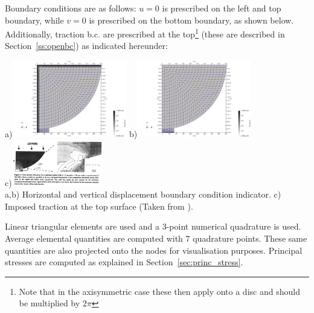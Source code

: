 Boundary conditions are as follows: $u=0$ is prescribed on the left and top boundary, 
while $v=0$ is prescribed on the bottom boundary, as shown below.
Additionally, traction b.c. are prescribed at the top\footnote{Note that 
in the axisymmetric case these then apply onto a disc and should be multiplied by $2\pi$} (these
are described in Section~\ref{ss:openbc}) as indicated hereunder:
\begin{center}
a)\includegraphics[width=5cm]{python_codes/fieldstone_63/images/bc_u}
b)\includegraphics[width=5cm]{python_codes/fieldstone_63/images/bc_v}\\
c)\includegraphics[width=4cm]{python_codes/fieldstone_63/images/wowu95}\\
{\captionfont a,b) Horizontal and vertical displacement boundary condition indicator.
c) Imposed traction at the top surface (Taken from \cite{wowu95}).}
\end{center}

Linear triangular elements are used and a 3-point numerical quadrature is used.
Average elemental quantities are computed with 7 quadrature points.
These same quantities are also projected onto the nodes for visualisation purposes.
Principal stresses are computed as explained in Section~\ref{sec:princ_stress}.

